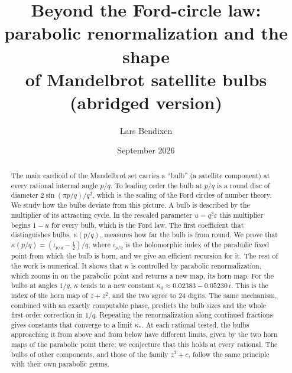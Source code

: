 \documentclass[11pt]{amsart}
\theoremstyle{definition}
\theoremstyle{remark}
\begin{document}
\title[Beyond the Ford-circle law (abridged)]{Beyond the Ford-circle law:\\ parabolic renormalization and the shape\\ of Mandelbrot satellite bulbs\\[0.4ex] {\normalsize\mdseries (abridged version)}}
\author{Lars Bendixen}
\date{September 2026}

\begin{abstract}
The main cardioid of the Mandelbrot set carries a ``bulb'' (a satellite component) at every rational internal angle $p/q$. To leading order the bulb at $p/q$ is a round disc of diameter $2\sin(\pi p/q)/q^2$, which is the scaling of the Ford circles of number theory. We study how the bulbs deviate from this picture. A bulb is described by the multiplier of its attracting cycle. In the rescaled parameter $u=q^2\varepsilon$ this multiplier begins $1-u$ for every bulb, which is the Ford law. The first coefficient that distinguishes bulbs, $\kappa(p/q)$, measures how far the bulb is from round. We prove that $\kappa(p/q)=(\iota_{p/q}-\frac12)/q$, where $\iota_{p/q}$ is the holomorphic index of the parabolic fixed point from which the bulb is born, and we give an efficient recursion for it. The rest of the work is numerical. It shows that $\kappa$ is controlled by parabolic renormalization, which zooms in on the parabolic point and returns a new map, its horn map. For the bulbs at angles $1/q$, $\kappa$ tends to a new constant $\kappa_0\approx0.02383-0.05230\,i$. This is the index of the horn map of $z+z^2$, and the two agree to $24$ digits. The same mechanism, combined with an exactly computable phase, predicts the bulb sizes and the whole first-order correction in $1/q$. Repeating the renormalization along continued fractions gives constants that converge to a limit $\kappa_*$. At each rational tested, the bulbs approaching it from above and from below have different limits, given by the two horn maps of the parabolic point there; we conjecture that this holds at every rational. The bulbs of other components, and those of the family $z^3+c$, follow the same principle with their own parabolic germs.
\end{abstract}

\maketitle
\end{document}
